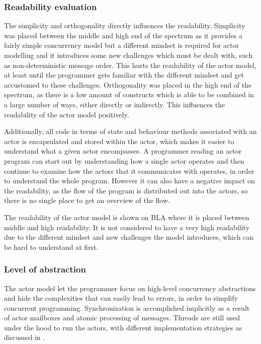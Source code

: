 \subsubsection{Readability evaluation}
The simplicity and orthogonality directly influences the readability. Simplicity was placed between the middle and high end of the spectrum as it provides a fairly simple concurrency model but a different mindset is required for actor modelling and it introduces some new challenges which must be dealt with, such as non-deterministic message order. This hurts the readability of the actor model, at least until the programmer gets familiar with the different mindset and get accustomed to these challenges. Orthogonality was placed in the high end of the spectrum, as there is a low amount of constructs which is able to be combined in a large number of ways, either directly or indirectly. This influences the readability of the actor model positively.

Additionally, all code in terms of state and behaviour methods associated with an actor is encapsulated and stored within the actor, which makes it easier to understand what a given actor encompasses. A programmer reading an actor program can start out by understanding how a single actor operates and then continue to examine how the actors that it communicates with operates, in order to understand the whole program. However it can also have a negative impact on the readability, as the flow of the program is distributed out into the actors, so there is no single place to get an overview of the flow. 

The readability of the actor model is shown on BLA where it is placed between middle and high readability. It is not considered to have a very high readability due to the different mindset and new challenges the model introduces, which can be hard to understand at first.


\subsubsection{Level of abstraction}\label{sec:actor_level_of_abstraction}
The actor model let the programmer focus on high-level concurrency abstractions and hide the complexities that can easily lead to errors, in order to simplify concurrent programming. Synchronization is accomplished implicitly as a result of actor mailboxes and atomic processing of messages. Threads are still used under the hood to run the actors, with different implementation strategies as discussed in .

